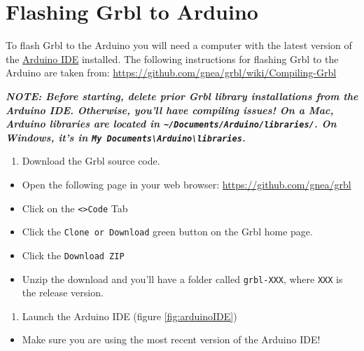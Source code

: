 \documentclass[]{book}
\providecommand{\tightlist}{%
  \setlength{\itemsep}{0pt}\setlength{\parskip}{0pt}}
\theoremstyle{definition}
\theoremstyle{definition}
\theoremstyle{definition}
\theoremstyle{remark}
\begin{document}
\section{Flashing Grbl to Arduino}\label{flashing-grbl-to-arduino}

To flash Grbl to the Arduino you will need a computer with the latest
version of the \href{https://www.arduino.cc/en/Main/Software}{Arduino
IDE} installed. The following instructions for flashing Grbl to the
Arduino are taken from:
\url{https://github.com/gnea/grbl/wiki/Compiling-Grbl}

\emph{\textbf{NOTE: Before starting, delete prior Grbl library
installations from the Arduino IDE. Otherwise, you'll have compiling
issues! On a Mac, Arduino libraries are located in
\texttt{\textasciitilde{}/Documents/Arduino/libraries/}. On Windows,
it's in
\texttt{My\ Documents\textbackslash{}Arduino\textbackslash{}libraries}.}}

\begin{enumerate}
\def\labelenumi{\arabic{enumi}.}
\tightlist
\item
  Download the Grbl source code.
\end{enumerate}

\begin{itemize}
\tightlist
\item
  Open the following page in your web browser:
  \url{https://github.com/gnea/grbl}
\item
  Click on the \texttt{\textless{}\textgreater{}Code} Tab
\item
  Click the \texttt{Clone\ or\ Download} green button on the Grbl home
  page.
\item
  Click the \texttt{Download\ ZIP}
\item
  Unzip the download and you'll have a folder called \texttt{grbl-XXX},
  where \texttt{XXX} is the release version.
\end{itemize}

\begin{enumerate}
\def\labelenumi{\arabic{enumi}.}
\setcounter{enumi}{1}
\tightlist
\item
  Launch the Arduino IDE (figure \ref{fig:arduinoIDE})
\end{enumerate}

\begin{itemize}
\tightlist
\item
  Make sure you are using the most recent version of the Arduino IDE!
\end{itemize}
\end{document}
